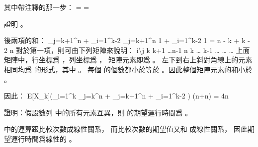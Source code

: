 其中帶注釋的那一步：
\startformula\startmathalignment
\NC   \NC [k+1 \le i \le n - 1][i+1 \le j \le n] \NR
\NC = \NC [k+1 \le i < i + 1 < j \le n] \NR
\NC = \NC [k + 1 < j \le n][k + 1 \le i < j] \NR
\stopmathalignment\stopformula
\stopANSWER

\startitem
證明 。
\stopitem

\startANSWER
後兩項的和：
\startformula
\sum_{j=k+1}^n + \sum_{i=1}^{k-2}
   \le \sum_{j=k+1}^n 1 + \sum_{i=1}^{k-2} 1
   = n - k + k - 2
   \le n
\stopformula
對於第一項，則可由下列矩陣來說明：
\startformula\startmatrix
\NC i\backslash j  \NC k \NC k+1 \NC \ldots \NC n-1 \NC n \NR
\NC k   \NC {} \NC \ldots \NC {} \NC {} \NR
\NC k-1\NC {} \NC {} \NC \ldots \NC {} \NC {} \NR
\NC \cdots \NC \cdots \NC \cdots\NC \ddots \NC \cdots \NC \cdots \NR
{}  \NC {} \NC {}   \NC \ldots \NC {} \NC {} \NR
{}  \NC {}   \NC {} \NC \ldots \NC {} \NC {}   \NR
\stopmatrix\stopformula
上面矩陣中，行坐標爲 ，列坐標爲 ，
矩陣元素即爲 。
左下到右上斜對角線上的元素相同均爲  的形式，其中 。
每個  的個數都小於等於 。因此整個矩陣元素的和小於 。

因此：
\startformula
E[X_k]\left(\sum_{i=1}^k       \sum_{j=k}^n       
       + \sum_{j=k+1}^n     
       + \sum_{i=1}^{k-2}   
   \right) (n+n) = 4n
\stopformula
\stopANSWER

\startitem
證明：假設數列  中的所有元素互異，則  的期望運行時間爲 。
\stopitem

\startANSWER
{} 中的運算跟比較次數成線性關系，
而比較次數的期望值又和  成線性關系，
因此期望運行時間爲線性的 。
\stopANSWER
\stopigBase
\stopPROBLEM

\stopsubject%
